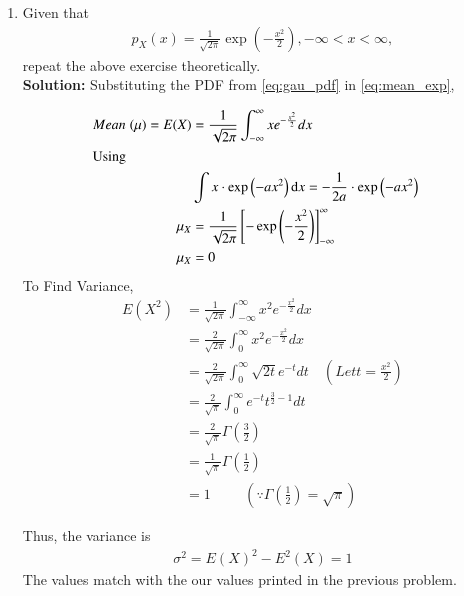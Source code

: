 \documentclass[journal,10pt,twocolumn]{IEEEtran}
\newcounter{Chapcounter}
\numberwithin{equation}{subsection}
\numberwithin{figure}{subsection}
\renewcommand\thesection{\theChapcounter.\arabic{section}}
\providecommand{\brak}[1]{\ensuremath{\left(#1\right)}}
\newcommand{\solution}{\noindent \textbf{Solution: }}
\renewcommand\thesection{\arabic{section}}
\renewcommand\thesubsection{\thesection.\arabic{subsection}}
\begin{document}
\begin{enumerate}[label=\thesubsection.\arabic*,ref=\thesubsection.\arabic{figure}]
\item Given that 
\begin{align}
p_{X}(x) = \frac{1}{\sqrt{2\pi}}\exp\brak{-\frac{x^2}{2}}, -\infty < x < \infty,
\label{eq:gau_pdf}
\end{align}
repeat the above exercise theoretically.\\
\solution Substituting the PDF from \eqref{eq:gau_pdf} in \eqref{eq:mean_exp},

\begin{align}
    Mean\hspace{0.1cm}(\mu) = E(X) &= \frac{1}{\sqrt{2\pi}} \int_{-\infty}^{\infty} x e^{-\frac{x^2}{2}}dx\\
    \intertext{Using}&
	\int x \cdot \exp \left( -a x^2 \right) \mathrm{d}x = -\frac{1}{2a} \cdot \exp \left( -a x^2 \right)&\\
	\mu_X &= \frac{1}{\sqrt{2\pi}}\left[-\exp\brak{-\frac{x^2}{2}}\right]_{-\infty}^{\infty}&\\  
	\mu_X &= 0
\end{align}
To Find Variance,
\begin{align}
    E\brak{X^2}&= \frac{1}{\sqrt{2\pi}}\int_{-\infty}^{\infty} x^2
e^ {-\frac{x^2}{2}} dx \\
    &= \frac{2}{\sqrt{2\pi}} \int_{0}^{\infty} x^2 e^{-\frac{x^2}{2}} dx\\
    &= \frac{2}{\sqrt{2\pi}}\int_{0}^{\infty}\sqrt{2t}e^{-t} dt \quad\brak{Let t = \frac{x^2}{2}}\\
    &= \frac{2}{\sqrt{\pi}} \int_{0}^{\infty} e^{-t} t^{\frac{3}{2}-1} dt\\
    &= \frac{2}{\sqrt{\pi}} \Gamma\brak{{\frac{3}{2}}}\\
    &= \frac{1}{\sqrt{\pi}}\Gamma\brak{\frac{1}{2}}  \\
    &= 1  \hspace{1cm} \brak{\because\Gamma\brak{\frac{1}{2}}=\sqrt{\pi}}
\end{align}

%
Thus, the  variance is
\begin{align}
    \sigma^2 =  E\brak X^2 - E^2\brak X = 1
\end{align}
The values match with the our values printed in the previous problem.
\end{enumerate}
\end{document}
